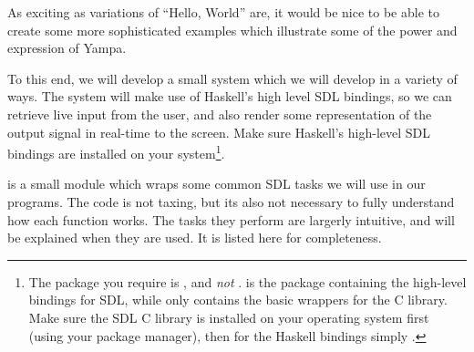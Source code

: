 As exciting as variations of ``Hello, World'' are, it would be nice to be able to create some more sophisticated examples which illustrate some of the power and expression of Yampa.

To this end, we will develop a small system which we will develop in a variety of ways.  The system will make use of Haskell's high level SDL bindings, so we can retrieve live input from the user, and also render some representation of the output signal in real-time to the screen. Make sure Haskell's high-level SDL bindings are installed on your system\footnote{The package you require is , and \emph{not} .  is the package containing the high-level bindings for SDL, while  only contains the basic wrappers for the C library. Make sure the SDL C library is installed on your operating system first (using your package manager), then for the Haskell bindings simply .}.



 is a small module which wraps some common SDL tasks we will use in our programs. The code is not taxing, but its also not necessary to fully understand how each function works. The tasks they perform are largerly intuitive, and will be explained when they are used. It is listed here for completeness.



% 
